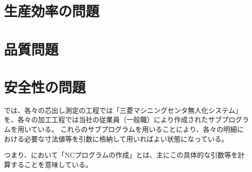 

\section{生産効率の問題\TBW}
\section{品質問題\TBW}
\section{安全性の問題\TBW}
\MMC では、各々の芯出し測定の工程では「三菱マシニングセンタ無人化システム」を、各々の加工工程では当社の従業員（一般職）により作成されたサブプログラムを用いている。
これらのサブプログラムを用いることにより、各々の明細における必要な寸法値等を引数に格納して用いればよい状態になっている。
\begin{marker}
つまり、\MMC において「NCプログラムの作成」とは、主にこの具体的な引数等を計算することを意味している。
\end{marker}




